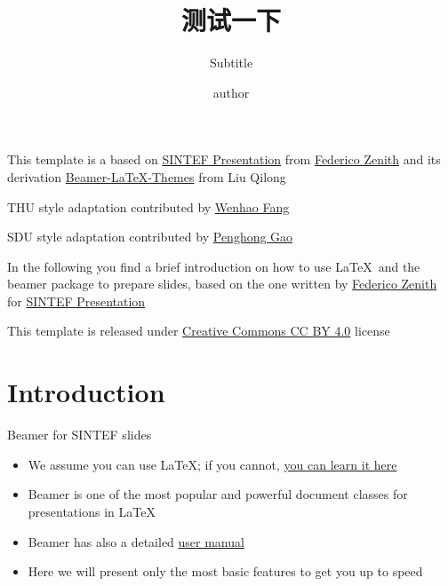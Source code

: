 \documentclass{beamer}
\title{测试一下}
\subtitle{Subtitle}
\author{author}
\newcommand{\hrefcol}[2]{\textcolor{cyan}{\href{#1}{#2}}}
\begin{document}
\maketitle

\begin{frame}

This template is a based on \hrefcol{https://www.overleaf.com/latex/templates/sintef-presentation/jhbhdffczpnx}{SINTEF Presentation} from \hrefcol{mailto:federico.zenith@sintef.no}{Federico Zenith} and its derivation \hrefcol{https://github.com/TOB-KNPOB/Beamer-LaTeX-Themes}{Beamer-LaTeX-Themes} from Liu Qilong

\vspace{\baselineskip}

THU style adaptation contributed by \hrefcol{https://github.com/FangWHao}{Wenhao Fang}

SDU style adaptation contributed by \hrefcol{https://github.com/almostgph}{Penghong Gao}


\vspace{\baselineskip}

In the following you find a brief introduction on how to use \LaTeX\ and the beamer package to prepare slides, based on the one written by \hrefcol{mailto:federico.zenith@sintef.no}{Federico Zenith} for \hrefcol{https://www.overleaf.com/latex/templates/sintef-presentation/jhbhdffczpnx}{SINTEF Presentation}

\vspace{\baselineskip}

This template is released under \hrefcol{https://creativecommons.org/licenses/by-nc/4.0/legalcode}{Creative Commons CC BY 4.0} license

\end{frame}

\section{Introduction}

\begin{frame}{Beamer for SINTEF slides}
\begin{itemize}
\item We assume you can use \LaTeX; if you cannot,
\hrefcol{http://en.wikibooks.org/wiki/LaTeX/}{you can learn it here}
\item Beamer is one of the most popular and powerful document
classes for presentations in \LaTeX
\item Beamer has also a detailed
\hrefcol{http://www.ctan.org/tex-archive/macros/latex/contrib/beamer/doc/beameruserguide.pdf}{user
 manual}
\item Here we will present only the most basic features to get you up to speed
\end{itemize}
\end{frame}
\end{document}

